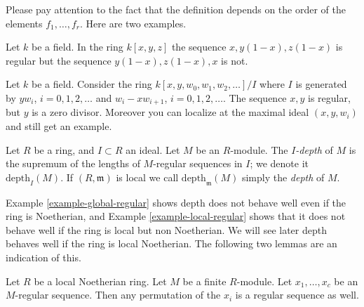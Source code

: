 \noindent
Please pay attention to the fact that the definition depends
on the order of the elements $f_1,\ldots,f_r$. Here are two 
examples.

\begin{example}
\label{example-global-regular}
Let $k$ be a field. In the ring $k[x,y,z]$
the sequence $x, y(1-x), z(1-x)$ is regular
but the sequence $y(1-x), z(1-x), x$ is not.
\end{example}

\begin{example}
\label{example-local-regular}
Let $k$ be a field. Consider the ring 
$k[x,y,w_0,w_1,w_2,\ldots]/I$
where $I$ is generated by $yw_i$, $i=0,1,2,\ldots$ and
$w_i - xw_{i+1}$, $i=0,1,2,\ldots$.
The sequence $x, y$ is regular, but $y$ is a zero divisor.
Moreover you can localize at the maximal ideal
$(x,y,w_i)$ and still get an example.
\end{example}

\begin{definition}
\label{definition-depth}
Let $R$ be a ring, and $I \subset R$ an ideal.
Let $M$ be an $R$-module.
The {\it $I$-depth} of $M$ is the supremum of the lengths
of $M$-regular sequences in $I$; we denote it
$\text{depth}_I(M)$. If $(R, \mathfrak m)$ is
local we call $\text{depth}_{\mathfrak m}(M)$ simply
the {\it depth} of $M$.
\end{definition}

\noindent
Example \ref{example-global-regular} shows depth does not
behave well even if the ring is Noetherian, and Example
\ref{example-local-regular} shows that it does not
behave well if the ring is local but non Noetherian.
We will see later depth behaves well if the ring is local
Noetherian. The following two lemmas are an indication of this.

\begin{lemma}
\label{lemma-permute-xi}
Let $R$ be a local Noetherian ring.
Let $M$ be a finite $R$-module.
Let $x_1,\ldots,x_c$ be an $M$-regular sequence.
Then any permutation of the $x_i$ is a regular
sequence as well.
\end{lemma}

